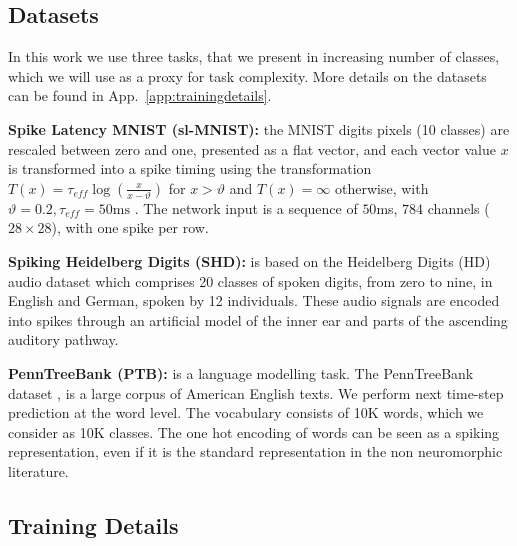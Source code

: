 \subsection{Datasets}
\label{sec:datasets}

In this work we use three tasks, that we present in increasing number of classes, which we will use as a proxy for task complexity. 
More details on the datasets can be found in App.~\ref{app:trainingdetails}.

\noindent\textbf{Spike Latency MNIST (sl-MNIST):} the MNIST digits \cite{mnist} pixels (10 classes) are rescaled between zero and one, presented as a flat vector, and each vector value $x$ is transformed into a spike timing using the transformation $T(x) = \tau_{eff}\log(\frac{x}{x-\vartheta})$ for $x>\vartheta$ and  $T(x) = \infty$ otherwise, with $\vartheta=0.2, \tau_{eff}=50 \text{ms}$ \cite{zenke2021remarkable}. The network input is a sequence of $50$ms, $784$ channels ($28\times 28$), with one spike per row.

\noindent\textbf{Spiking Heidelberg Digits (SHD):} is based on the Heidelberg Digits (HD)  audio dataset \cite{cramer2020heidelberg} which comprises 20 classes of spoken digits, from zero to nine, in English and German, spoken by 12 individuals.  These audio signals are encoded into spikes through an artificial model of the inner ear and parts of the ascending auditory pathway.

\noindent\textbf{PennTreeBank (PTB):} is a language modelling task. The PennTreeBank dataset \cite{ptb}, is a large corpus of American English texts. We perform next time-step prediction at the word level. The vocabulary consists of 10K words, which we consider as 10K classes. The one hot encoding of words can be seen as a spiking representation, even if it is the standard representation in the non neuromorphic literature.

\subsection{Training Details}

